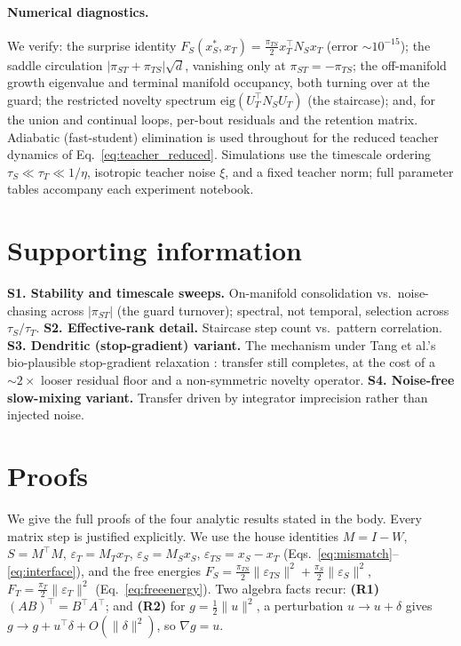 \documentclass[10pt,letterpaper]{article}
\theoremstyle{plain}
\theoremstyle{remark}
\newcommand{\eps}{\varepsilon}
\newcommand{\xT}{x_T}
\newcommand{\xS}{x_S}
\newcommand{\MT}{M_T}
\newcommand{\MS}{M_S}
\newcommand{\NS}{N_S}
\newcommand{\FS}{F_S}
\newcommand{\FT}{F_T}
\newcommand{\epsT}{\eps_T}
\newcommand{\epsS}{\eps_S}
\newcommand{\epsTS}{\eps_{TS}}
\newcommand{\piT}{\pi_T}
\newcommand{\piS}{\pi_S}
\newcommand{\piTS}{\pi_{TS}}
\newcommand{\piST}{\pi_{ST}}
\newcommand{\tauT}{\tau_T}
\newcommand{\tauS}{\tau_S}
\newcommand{\UT}{U_T}
\newcommand{\tr}{^{\!\top}}
\begin{document}
\paragraph{Numerical diagnostics.} We verify: the surprise identity
$\FS(\xS^*,\xT)=\tfrac{\piTS}{2}\xT\tr\NS\xT$ (error $\sim10^{-15}$); the saddle circulation
$|\piST+\piTS|\sqrt{d}$, vanishing only at $\piST=-\piTS$; the off-manifold growth eigenvalue and terminal
manifold occupancy, both turning over at the guard; the restricted novelty spectrum
$\mathrm{eig}(\UT\tr\NS\UT)$ (the staircase); and, for the union and continual loops, per-bout residuals
and the retention matrix. Adiabatic (fast-student) elimination is used throughout for the reduced teacher
dynamics of Eq.~\eqref{eq:teacher_reduced}. Simulations use the timescale ordering
$\tauS\ll\tauT\ll 1/\eta$, isotropic teacher noise $\xi$, and a fixed teacher norm; full parameter tables
accompany each experiment notebook.

\section*{Supporting information}
\textbf{S1. Stability and timescale sweeps.} On-manifold consolidation vs.\ noise-chasing across
$|\piST|$ (the guard turnover); spectral, not temporal, selection across $\tauS/\tauT$.
\textbf{S2. Effective-rank detail.} Staircase step count vs.\ pattern correlation.
\textbf{S3. Dendritic (stop-gradient) variant.} The mechanism under Tang et al.'s bio-plausible
stop-gradient relaxation \cite{tang2023covpcn}: transfer still completes, at the cost of a
$\sim\!2\times$ looser residual floor and a non-symmetric novelty operator.
\textbf{S4. Noise-free slow-mixing variant.} Transfer driven by integrator imprecision rather than
injected noise.

\appendix
\section{Proofs}
\label{app:proofs}
We give the full proofs of the four analytic results stated in the body. Every matrix step is
justified explicitly. We use the house identities $M=I-W$, $S=M\tr M$, $\epsT=\MT\xT$, $\epsS=\MS\xS$,
$\epsTS=\xS-\xT$ (Eqs.~\ref{eq:mismatch}--\ref{eq:interface}), and the free energies
$\FS=\tfrac{\piTS}{2}\|\epsTS\|^2+\tfrac{\piS}{2}\|\epsS\|^2$, $\FT=\tfrac{\piT}{2}\|\epsT\|^2$
(Eq.~\ref{eq:freeenergy}). Two algebra facts recur: \textbf{(R1)} $(AB)\tr=B\tr A\tr$; and
\textbf{(R2)} for $g=\tfrac12\|u\|^2$, a perturbation $u\to u+\delta$ gives $g\to g+u\tr\delta+O(\|\delta\|^2)$,
so $\nabla g=u$.
\end{document}
